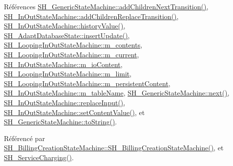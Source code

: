 Références \hyperlink{classSH__GenericStateMachine_a16d844020bc26480bd81d6b794c8364c}{S\-H\-\_\-\-Generic\-State\-Machine\-::add\-Children\-Next\-Transition()}, \hyperlink{classSH__InOutStateMachine_ae0f3b4622d2c70884bb224dee86e95c0}{S\-H\-\_\-\-In\-Out\-State\-Machine\-::add\-Children\-Replace\-Transition()}, \hyperlink{classSH__InOutStateMachine_af71bfdb3b59b7bf2763588b513b4205f}{S\-H\-\_\-\-In\-Out\-State\-Machine\-::history\-Value()}, \hyperlink{classSH__AdaptDatabaseState_a037db544ea05f42d21fcbdda758839fe}{S\-H\-\_\-\-Adapt\-Database\-State\-::insert\-Update()}, \hyperlink{classSH__LoopingInOutStateMachine_a145e625dcb4d5438bd9c761eeb9425d4}{S\-H\-\_\-\-Looping\-In\-Out\-State\-Machine\-::m\-\_\-contents}, \hyperlink{classSH__LoopingInOutStateMachine_af64f9f28a1b8e82bd9ee5f4b96a7c82e}{S\-H\-\_\-\-Looping\-In\-Out\-State\-Machine\-::m\-\_\-current}, \hyperlink{classSH__InOutStateMachine_a8cfbc27eef057bf37b7711bdfef2077e}{S\-H\-\_\-\-In\-Out\-State\-Machine\-::m\-\_\-io\-Content}, \hyperlink{classSH__LoopingInOutStateMachine_a818a60d3691fcac11323ad114c309dcb}{S\-H\-\_\-\-Looping\-In\-Out\-State\-Machine\-::m\-\_\-limit}, \hyperlink{classSH__LoopingInOutStateMachine_a4e9ea23cf1eecbe26c6ed93b290a9115}{S\-H\-\_\-\-Looping\-In\-Out\-State\-Machine\-::m\-\_\-persistent\-Content}, \hyperlink{classSH__InOutStateMachine_aa009eecc5ab6181358faafb5996b6006}{S\-H\-\_\-\-In\-Out\-State\-Machine\-::m\-\_\-table\-Name}, \hyperlink{classSH__GenericStateMachine_af4771d31d87951c997fba1633c2d67f6}{S\-H\-\_\-\-Generic\-State\-Machine\-::next()}, \hyperlink{classSH__InOutStateMachine_a9fa5db44086de2576c812f631aa4f60a}{S\-H\-\_\-\-In\-Out\-State\-Machine\-::replace\-Input()}, \hyperlink{classSH__InOutStateMachine_a9ab1534306b2bdb62743d4bcefe40c17}{S\-H\-\_\-\-In\-Out\-State\-Machine\-::set\-Content\-Value()}, et \hyperlink{classSH__GenericStateMachine_a85c0c1c9d258ae991f84667412fa47cd}{S\-H\-\_\-\-Generic\-State\-Machine\-::to\-String()}.



Référencé par \hyperlink{classSH__BillingCreationStateMachine_ad62b77fa4aeafe200056ff3974562f83}{S\-H\-\_\-\-Billing\-Creation\-State\-Machine\-::\-S\-H\-\_\-\-Billing\-Creation\-State\-Machine()}, et \hyperlink{classSH__ServiceCharging_afa5273d046049b1c2b020a6a19a8290b}{S\-H\-\_\-\-Service\-Charging()}.


